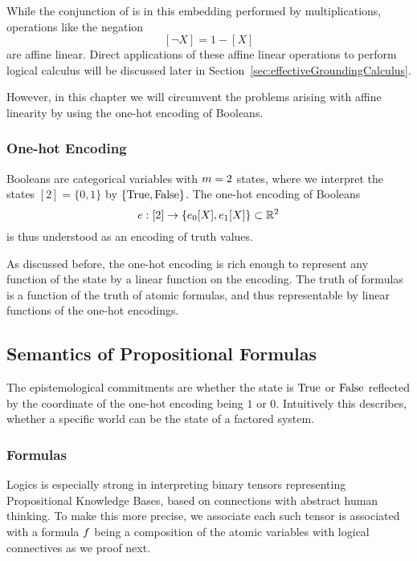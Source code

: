 While the conjunction of is in this embedding performed by multiplications, operations like the negation
	\[ [\lnot X] = 1 - [X]  \]
are affine linear.
Direct applications of these affine linear operations to perform logical calculus will be discussed later in Section~\ref{sec:effectiveGroundingCalculus}.

However, in this chapter we will circumvent the problems arising with affine linearity by using the one-hot encoding of Booleans.


\subsubsection{One-hot Encoding} %

Booleans are categorical variables with $m=2$ states, where we interpret the states $[2]=\{0,1\}$ by $\{\mathrm{True},\mathrm{False}\}$.
The one-hot encoding of Booleans
	\[ e: [2] \rightarrow \{e_0[X] ,e_1[X] \}  \subset \mathbb{R}^2 \]
is thus understood as an encoding of truth values.

As discussed before, the one-hot encoding is rich enough to represent any function of the state by a linear function on the encoding.
The truth of formulas is a function of the truth of atomic formulas, and thus representable by linear functions of the one-hot encodings.




\subsection{Semantics of Propositional Formulas}

The epistemological commitments are whether the state is $\mathrm{True}$ or $\mathrm{False}$ reflected by the coordinate of the one-hot encoding being $1$ or $0$.
Intuitively this describes, whether a specific world can be the state of a factored system.

\subsubsection{Formulas}

Logics is especially strong in interpreting binary tensors representing Propositional Knowledge Bases, based on connections with abstract human thinking.
To make this more precise, we associate each such tensor is associated with a formula $f$ being a composition of the atomic variables with logical connectives as we proof next.


